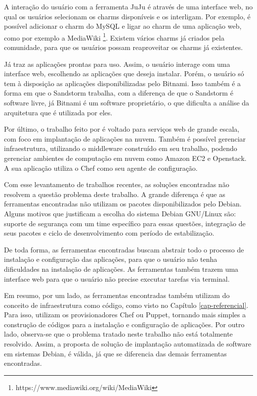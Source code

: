 A interação do usuário com a ferramenta JuJu é através de uma interface web, 
no qual os usuários selecionam os charms disponíveis e os interligam. 
Por exemplo, é possível adicionar o charm do MySQL e ligar ao charm de uma aplicação
web, como por exemplo a MediaWiki \footnote{https://www.mediawiki.org/wiki/MediaWiki}. Existem
vários charms já criados pela comunidade, para que os usuários possam reaproveitar
os charms já existentes.
 
Já  traz as aplicações prontas para uso. Assim, o usuário interage com 
uma interface web, escolhendo as aplicações que deseja instalar. Porém,
o usuário só tem à disposição as aplicações disponibilizadas pelo Bitnami. Isso
também é a forma em que o Sandstorm trabalha, com a diferença de que o Sandstorm é
software livre, já Bitnami é um software proprietário, o que dificulta a análise da arquitetura
que é utilizada por eles. 

Por último, o trabalho feito por  é voltado
para serviços web de grande escala, com foco em implantação de aplicações na
nuvem. Também é possível gerenciar infraestrutura, utilizando o middleware construído 
em seu trabalho, podendo gerenciar ambientes de computação em nuvem como Amazon EC2 e 
Openstack. A sua aplicação utiliza o Chef como seu agente de configuração.

Com esse levantamento de trabalhos recentes, as soluções encontradas não resolvem 
a questão problema deste trabalho. A grande diferença é que as ferramentas 
encontradas não utilizam os pacotes disponibilizados pelo Debian. Alguns motivos
que justificam a escolha do sistema Debian GNU/Linux são: suporte de segurança
com um time específico para essas questões, integração de seus pacotes e ciclo de desenvolvimento 
com período de estabilização. 

De toda forma, as ferramentas encontradas buscam
abstrair todo o processo de instalação e configuração das aplicações, para que o
usuário não tenha dificuldades na instalação de aplicações. As ferramentas também
trazem uma interface web para que o usuário não precise executar tarefas via terminal.

Em resumo, por um lado, as ferramentas encontradas também utilizam do conceito de
infraestrutura como código, como visto no Capítulo \ref{cap-referencial}. Para
isso, utilizam os provisionadores Chef ou Puppet, tornando mais simples a
construção de códigos para a instalação e configuração de aplicações. Por outro lado, 
observa-se que o problema tratado neste trabalho não está totalmente resolvido. Assim, 
a proposta de solução de implantação automatizada de software em sistemas Debian, é válida, 
já que se diferencia das demais ferramentas encontradas.

